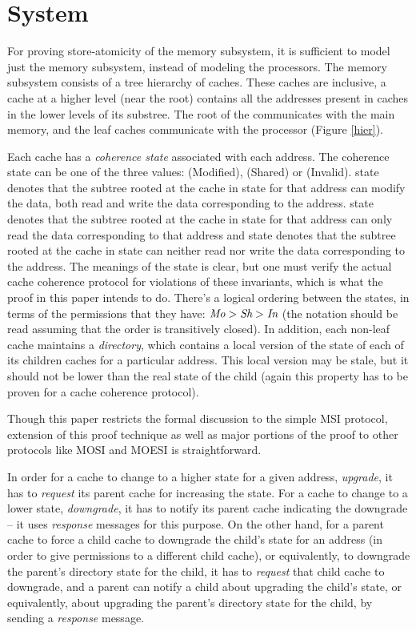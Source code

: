 \section{System}
\label{sec:System}

For proving store-atomicity of the memory subsystem, it is sufficient to model
just the memory subsystem, instead of modeling the processors.
The memory subsystem consists of a tree hierarchy of caches. These
caches are inclusive, \ie a cache at a higher level (near the root) contains
all the addresses present in caches in the lower levels of its substree. The
root of the communicates with the main memory, and the leaf caches communicate
with the processor (Figure \ref{hier}).

Each cache has a \emph{coherence state} associated with each address. The
coherence state can be one of the three values: \Mo{} (Modified), \Sh{} (Shared) or
\In{} (Invalid). \Mo{} state denotes that the subtree rooted at the cache in \Mo{}
state for that address can modify the data, \ie{} both read and write the data
corresponding to the address. \Sh{} state denotes that the subtree rooted at the
cache in \Sh{} state for that address can only read the data corresponding to
that address and \In{} state denotes that the subtree rooted at the cache in \In{}
state can neither read nor write the data corresponding to the address. The
meanings of the state is clear, but one must verify the actual cache coherence
protocol for violations of these invariants, which is what the proof in this
paper intends to do. There's a logical ordering between the states, in terms of
the permissions that they have: $\textit{Mo} > \textit{Sh} > \textit{In}$ (the notation should be read
assuming that the order is transitively closed).
In addition, each non-leaf cache maintains a \emph{directory}, which contains a
local version of the state of each of its children caches for a particular address.
This local version may be stale, but it should not be lower than the real state
of the child (again this property has to be proven for a cache coherence
protocol).

Though this paper restricts the formal discussion to the simple MSI protocol,
extension of this proof technique as well as major portions of the proof to
other protocols like MOSI and MOESI is straightforward.

In order for a cache to change to a higher state for a given address, \ie
\emph{upgrade}, it has to \emph{request} its parent cache for increasing the
state.  For a cache to change to a lower state, \ie \emph{downgrade}, it has to
notify its parent cache indicating the downgrade -- it uses \emph{response}
messages for this purpose. On the other hand, for a parent cache to force a
child cache to downgrade the child's state for an address (in order to give
permissions to a different child cache), or equivalently, to downgrade the
parent's directory state for the child, it has to \emph{request} that child
cache to downgrade, and a parent can notify a child about upgrading the child's
state, or equivalently, about upgrading the parent's directory state for the
child, by sending a \emph{response} message.

